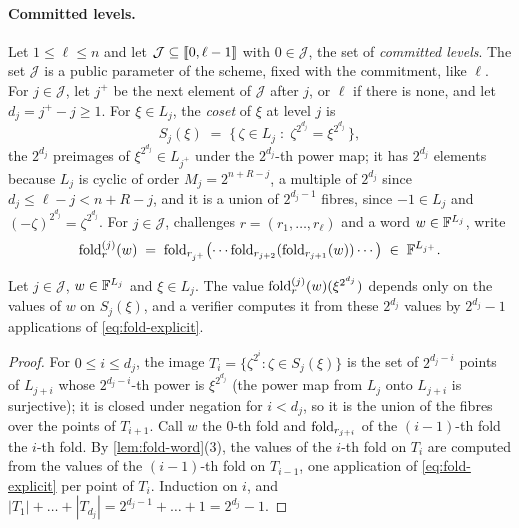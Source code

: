 \paragraph{Committed levels.}
Let $1 \le \ell \le n$ and let $\mathcal{J} \subseteq \llbracket 0, \ell-1 \rrbracket$ with $0 \in \mathcal{J}$, the set of \emph{committed levels}.
The set $\mathcal{J}$ is a public parameter of the scheme, fixed with the commitment, like $\ell$.
For $j \in \mathcal{J}$, let $j^+$ be the next element of $\mathcal{J}$ after $j$, or $\ell$ if there is none, and let $d_j = j^+ - j \ge 1$.
For $\xi \in L_j$, the \emph{coset} of $\xi$ at level $j$ is
\[
  S_j(\xi) \;=\; \bigl\{\, \zeta \in L_j \;:\; \zeta^{2^{d_j}} = \xi^{2^{d_j}} \,\bigr\},
\]
the $2^{d_j}$ preimages of $\xi^{2^{d_j}} \in L_{j^+}$ under the $2^{d_j}$-th power map; it has $2^{d_j}$ elements because $L_j$ is cyclic of order $M_j = 2^{n+R-j}$, a multiple of $2^{d_j}$ since $d_j \le \ell - j < n + R - j$, and it is a union of $2^{d_j - 1}$ fibres, since $-1 \in L_j$ and $(-\zeta)^{2^{d_j}} = \zeta^{2^{d_j}}$.
For $j \in \mathcal{J}$, challenges $r = (r_1,\dots,r_\ell)$ and a word $w \in \mathbb{F}^{L_j}$, write
\[
  \mathrm{fold}^{(j)}_r(w) \;=\; \mathrm{fold}_{r_{j^+}}\bigl(\cdots \mathrm{fold}_{r_{j+2}}(\mathrm{fold}_{r_{j+1}}(w))\cdots\bigr) \;\in\; \mathbb{F}^{L_{j^+}}.
\]

\begin{lemma}\label{lem:local-fold}
Let $j \in \mathcal{J}$, $w \in \mathbb{F}^{L_j}$ and $\xi \in L_j$. The value $\mathrm{fold}^{(j)}_r(w)(\xi^{2^{d_j}})$ depends only on the values of $w$ on $S_j(\xi)$, and a verifier computes it from these $2^{d_j}$ values by $2^{d_j} - 1$ applications of \eqref{eq:fold-explicit}.
\end{lemma}

\begin{proof}
For $0 \le i \le d_j$, the image $T_i = \{\zeta^{2^i} : \zeta \in S_j(\xi)\}$ is the set of $2^{d_j - i}$ points of $L_{j+i}$ whose $2^{d_j - i}$-th power is $\xi^{2^{d_j}}$ (the power map from $L_j$ onto $L_{j+i}$ is surjective); it is closed under negation for $i < d_j$, so it is the union of the fibres over the points of $T_{i+1}$.
Call $w$ the $0$-th fold and $\mathrm{fold}_{r_{j+i}}$ of the $(i-1)$-th fold the $i$-th fold. By \cref{lem:fold-word}(3), the values of the $i$-th fold on $T_i$ are computed from the values of the $(i-1)$-th fold on $T_{i-1}$, one application of \eqref{eq:fold-explicit} per point of $T_i$. Induction on $i$, and $|T_1| + \dots + |T_{d_j}| = 2^{d_j - 1} + \dots + 1 = 2^{d_j} - 1$.
\end{proof}

